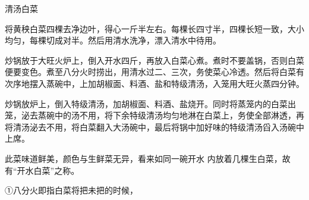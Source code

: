 \begin{recipe}[名开水白菜]{清汤白菜}

\ingredients


\cooking

\step 将黄秧白菜四棵去净边叶，得心一斤半左右。每棵长四寸半，四棵长短一致，大小均匀，每棵切成对半。然后用清水洗净，漂入清水中待用。

\step 炒锅放于大旺火炉上，倒入开水四斤，再放入白菜心煮。煮时不要盖锅，否则白菜便要变色。煮至八分火时捞出，用清水过二、三次，务使菜心冷透。然后将白菜有次序地摆入蒸碗中，上加胡椒面、料酒、盐和特级清汤，入笼用大旺火蒸四分钟。

\step 炒锅放炉上，倒入特级清汤，加胡椒面、料酒、盐烧开。同时将蒸笼内的白菜出笼，泌去蒸碗中的汤不用，将下余特级清汤均匀地淋在白菜上，务使全部淋透，再将清汤泌去不用，将白菜翻入大汤碗中，最后将锅中加好味的特级清汤舀入汤碗中上席。

\notes

此菜味道鲜美，颜色与生鲜菜无异，看来如同一碗开水 内放着几棵生白菜，故有“开水白菜”之称。

①八分火即指白菜将把未把的时候，

\end{recipe}

